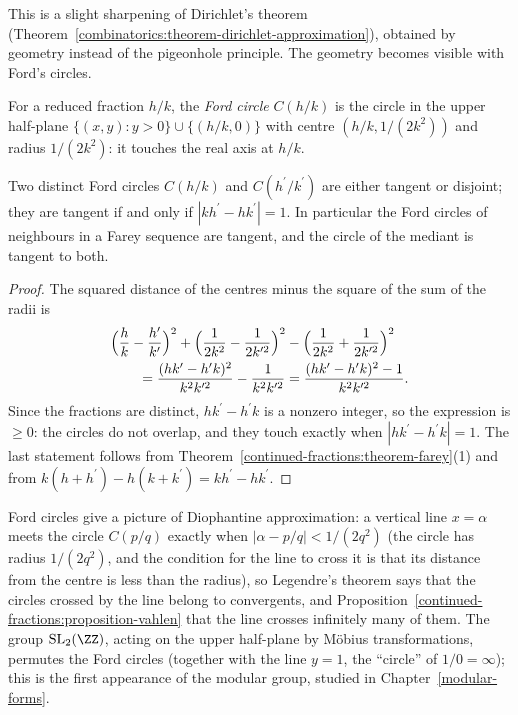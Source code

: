 This is a slight sharpening of Dirichlet's theorem (Theorem~\ref{combinatorics:theorem-dirichlet-approximation}), obtained by geometry instead of the pigeonhole principle. The geometry becomes
visible with Ford's circles.

\begin{definition}\label{continued-fractions:definition-ford}
For a reduced fraction $h/k$, the \emph{Ford circle} $C(h/k)$ is the circle in the upper half-plane $\{(x, y) : y > 0\} \cup \{(h/k, 0)\}$ with centre $(h/k, 1/(2k^2))$ and radius $1/(2k^2)$: it
touches the real axis at $h/k$.
\end{definition}

\begin{proposition}[Ford]\label{continued-fractions:proposition-ford}
Two distinct Ford circles $C(h/k)$ and $C(h^{\prime}/k^{\prime})$ are either tangent or disjoint; they are tangent if and only if $|kh^{\prime} - hk^{\prime}| = 1$. In particular the Ford circles of
neighbours in a Farey sequence are tangent, and the circle of the mediant is tangent to both.
\end{proposition}

\begin{proof}
The squared distance of the centres minus the square of the sum of the radii is
\[
\begin{aligned}
&\Bigl(\frac hk - \frac{h^{\prime}}{k^{\prime}}\Bigr)^2 + \Bigl(\frac{1}{2k^2} - \frac{1}{2k^{\prime 2}}\Bigr)^2 - \Bigl(\frac{1}{2k^2} + \frac{1}{2k^{\prime 2}}\Bigr)^2\\
&\qquad = \frac{(hk^{\prime} - h^{\prime}k)^2}{k^2k^{\prime 2}} - \frac{1}{k^2k^{\prime 2}} = \frac{(hk^{\prime} - h^{\prime}k)^2 - 1}{k^2k^{\prime 2}}.
\end{aligned}
\]
Since the fractions are distinct, $hk^{\prime} - h^{\prime}k$ is a nonzero integer, so the expression is $\geq 0$: the circles do not overlap, and they touch exactly when $|hk^{\prime} - h^{\prime}k| = 1$.
The last statement follows from Theorem~\ref{continued-fractions:theorem-farey}(1) and from $k(h + h^{\prime}) - h(k + k^{\prime}) = kh^{\prime} - hk^{\prime}$.
\end{proof}

\begin{remark}\label{continued-fractions:remark-ford}
Ford circles give a picture of Diophantine approximation: a vertical line $x = \alpha$ meets the circle $C(p/q)$ exactly when $|\alpha - p/q| < 1/(2q^2)$ (the circle has radius $1/(2q^2)$, and the
condition for the line to cross it is that its distance from the centre is less than the radius), so Legendre's theorem says that the circles crossed by the line belong to convergents, and
Proposition~\ref{continued-fractions:proposition-vahlen} that the line crosses infinitely many of them. The group $\mathrm{SL}_2(\ZZ)$, acting on the upper half-plane by Möbius transformations,
permutes the Ford circles (together with the line $y = 1$, the ``circle'' of $1/0 = \infty$); this is the first appearance of the modular group, studied in Chapter~\ref{modular-forms}.
\end{remark}


